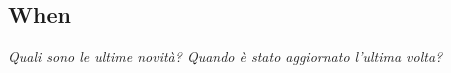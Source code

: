 \subsection{When}
\begin{center}

\textit{Quali sono le ultime novità? Quando è stato aggiornato l'ultima volta?}

\end{center}